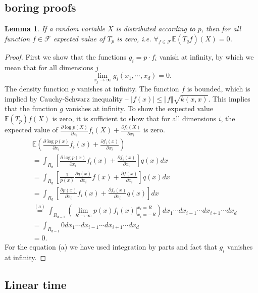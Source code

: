 \documentclass{article}
\newtheorem{lemma}{Lemma}
\newcommand{\ev}{\mathbb{E}}
\begin{document}
\appendix

\subsection{boring proofs}

\begin{lemma}
\label{lem:easy}
If a random variable $X$ is distributed according to $p$, then for all function $f \in \mathcal{F}$ expected  value of  $T_p$ is zero, i.e. $\forall_{f \in \mathcal{F}} \ev (T_{q}f)(X) = 0$.
\end{lemma}
\begin{proof}
First we show that the functions $g_i = p \cdot f_i$ vanish at infinity, by which we mean that for all dimensions $j$
\[
 \lim_{x_j \to \infty} g_i(x_1,\cdots,x_d) = 0. 
\]
The density function $p$ vanishes at infinity. The function $f$ is bounded,  which is implied by Cauchy-Schwarz inequality -- $\left|f(x)\right|\le\left\Vert f\right\Vert \sqrt{k(x,x)}$. This implies that the function $g$ vanishes at infinity. To show the expected value $\ev (T_{p})f(X)$ is zero, it is sufficient to show that for all dimensions $i$, the expected value of  $\frac{\partial \log p(X)}{ \partial x_i} f_i(X)+\frac{\partial f_i(X)}{ \partial x_i}$ is zero. 
\begin{align*}
&\ev\left( \frac{\partial \log p(x)}{ \partial x_i} f_i(x)+\frac{\partial f_i(x)}{ \partial x_i} \right) \\
& =\int_{R_d}   \left[ \frac{\partial \log p(x)}{ \partial x_i} f_i(x)+\frac{\partial f_i(x)}{ \partial x_i} \right]q(x)dx\\
 & =\int_{R_d} \left[\frac{1}{p(x)}\frac{\partial q(x)}{ \partial x_i}f(x)  +\frac{\partial f(x)}{ \partial x_i} \right]q(x)dx\\
 & =\int_{R_d} \left[\frac{\partial p(x)}{ \partial x_i} f_i(x)+\frac{\partial  f_i(x)}{ \partial x_i}q(x)\right]dx\\
 & \overset{(a)}{=} \int_{R_{d-1}} \left( \lim_{R \to \infty} p(x)f_i(x) \bigg|_{x_i=-R}^{x_i=R} \right) dx_1 \cdots dx_{i-1} \cdots dx_{i+1}  \cdots d{x_d} \\
 & = \int_{R_{d-1}} 0 dx_1 \cdots dx_{i-1} \cdots dx_{i+1} \cdots d{x_d} \\
 & =0.
\end{align*}
For the equation (a) we have used integration by parts and fact that $g_i$ vanishes at infinity.
\end{proof}


\subsection{Linear time}
\end{document}
